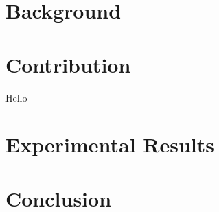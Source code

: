 \documentclass[12pt,twoside]{report}
\begin{document}
\chapter{Background}



\chapter{Contribution}
Hello \cite{VOCA2019}


\chapter{Experimental Results}


\chapter{Conclusion}




\end{document}
